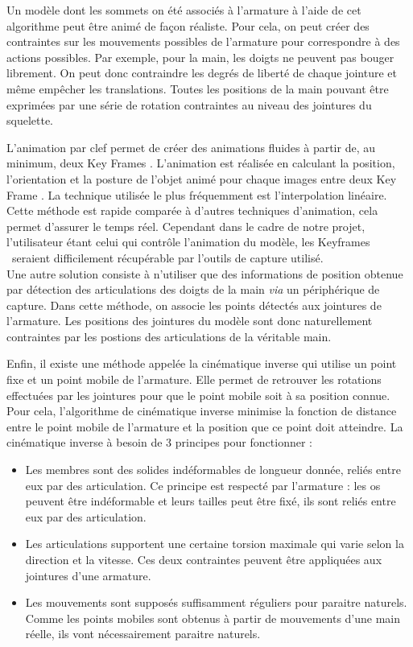 Un modèle dont les sommets on été associés à l'armature à l'aide de cet algorithme peut être \og animé \fg  de façon réaliste.
Pour cela, on peut créer des contraintes sur les mouvements possibles de l'armature pour correspondre à des actions possibles.
Par exemple, pour la main, les doigts ne peuvent pas bouger librement.
On peut donc contraindre les degrés de liberté de chaque jointure et même empêcher les translations.
Toutes les positions de la main pouvant être exprimées par une série de rotation contraintes au niveau des jointures du squelette.\newline

L'animation par clef permet de créer des animations fluides à partir de, au minimum, deux \og Key Frames \fg. L'animation est réalisée en calculant la position, l'orientation et la posture de l'objet animé pour chaque images entre deux \og Key Frame \fg. La technique utilisée le plus fréquemment est l'interpolation linéaire. Cette méthode est rapide comparée à d'autres techniques d'animation, cela permet d'assurer le temps réel. Cependant dans le cadre de notre projet, l'utilisateur étant celui qui contrôle l'animation du modèle, les \og Keyframes \fg \ seraient difficilement récupérable par l'outils de capture utilisé.\\

Une autre solution consiste à n'utiliser que des informations de position obtenue par détection des articulations des doigts de la main \textit{via} un périphérique de capture.
Dans cette méthode, on associe les points détectés aux jointures de l'armature. Les positions des jointures du modèle sont donc naturellement contraintes par les postions des articulations de la véritable main.\newline

Enfin, il existe une méthode appelée la cinématique inverse qui utilise un point fixe et un point mobile de l'armature. Elle permet de retrouver les rotations effectuées par les jointures pour que le point mobile soit à sa position connue. Pour cela, l'algorithme de cinématique inverse minimise la fonction de distance entre le point mobile de l'armature et la position que ce point doit atteindre.
La cinématique inverse à besoin de 3 principes pour fonctionner :\\
\begin{itemize}
	\item Les membres sont des solides indéformables de longueur donnée, reliés entre eux par des articulation. Ce principe est respecté par l'armature : les os peuvent être indéformable et leurs tailles peut être fixé, ils sont reliés entre eux par des articulation.
	\item Les articulations supportent une certaine torsion maximale qui varie selon la direction et la vitesse. Ces deux contraintes peuvent être appliquées aux jointures d'une armature.
	\item Les mouvements sont supposés suffisamment réguliers pour paraitre naturels. Comme les points mobiles sont obtenus à partir de mouvements d'une main réelle, ils vont nécessairement paraitre naturels.
\end{itemize}
